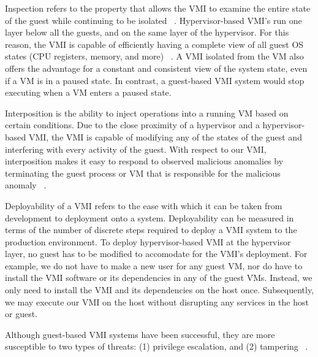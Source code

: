 \documentclass{report}
\begin{document}
\begin{spacing}{1.5}
{\large
\noindent Inspection refers to the property that allows the VMI to examine the entire state of the guest while continuing to be isolated ~\cite{pfoh2009formal}. Hypervisor-based VMI's run one layer below all the guests, and on the same layer of the hypervisor. For this reason, the VMI is capable of efficiently having a complete view of all guest OS states (CPU registers, memory, and more) ~\cite{hebbal2015virtual}. A VMI isolated from the VM also offers the advantage for a constant and consistent view of the system state, even if a VM is in a paused state. In contrast, a guest-based VMI system would stop executing when a VM enters a paused state.
\newline
}


{\large
\noindent Interposition is the ability to inject operations into a running VM based on certain conditions. Due to the close proximity of a hypervisor and a hypervisor-based VMI, the VMI is capable of modifying any of the states of the guest and interfering with every activity of the guest. With respect to our VMI, interposition makes it easy to respond to observed malicious anomalies by terminating the guest process or VM that is responsible for the malicious anomaly ~\cite{hebbal2015virtual}.
\newline
}


{\large
\noindent Deployability of a VMI refers to the ease with which it can be taken from development to deployment onto a system. Deployability can be measured in terms of the number of discrete steps required to deploy a VMI system to the production environment. To deploy hypervisor-based VMI at the hypervisor layer, no guest has to be modified to accomodate for the VMI's deployment. For example, we do not have to make a new user for any guest VM, nor do have to install the VMI software or its dependencies in any of the guest VMs. Instead, we only need to install the VMI and its dependencies on the host once. Subsequently, we may execute our VMI on the host without disrupting any services in the host or guest.
\newline
}


{\large
\noindent Although guest-based VMI systems have been successful, they are more susceptible to two types of threats: (1) privilege escalation, and (2) tampering ~\cite{pfoh2009formal}. 
\newline
}



\end{spacing}
\end{document}
